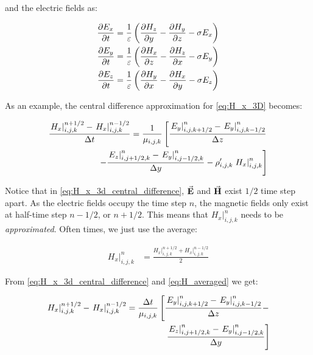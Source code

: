 \documentclass[11pt]{article}
\begin{document}
and the electric fields as:

\begin{subequations}
  \begin{align}
    \pdv{E_x}{t} & =\frac{1}{\varepsilon}\left(\pdv{H_z}{y}-\pdv{H_y}{z}-\sigma E_{x}\right) \label{eq:E_x_3D} \\
    \pdv{E_y}{t} & =\frac{1}{\varepsilon}\left(\pdv{H_x}{z}-\pdv{H_z}{x}-\sigma E_{y}\right) \label{eq:E_y_3D} \\
    \pdv{E_z}{t} & =\frac{1}{\varepsilon}\left(\pdv{H_y}{x}-\pdv{H_x}{y}-\sigma E_{z}\right) \label{eq:E_z_3D}
  \end{align}
  \label{eq:electric}
\end{subequations}

As an example, the central difference approximation for \eqref{eq:H_x_3D} becomes:

\begin{align}
  \frac{\left. H_{x} \right|^{n + 1/2}_{i,j,k} - \left. H_{x} \right|^{n - 1/2}_{i,j,k}}{\Delta t}  = \frac{1}{\mu_{i,j,k}}
  \left[
  \frac{\left. E_y \right|^{n}_{i,j,k+1/2} - \left. E_y \right|^{n}_{i,j,k-1/2}}{\Delta z}  \right. \nonumber \\
  \left. - \frac{\left. E_z \right|^{n}_{i,j+1/2,k} - \left. E_y \right|^{n}_{i,j-1/2,k}}{\Delta y} - \rho'_{i,j,k} \left. H_x \right|^{n}_{i,j,k}
  \right]                                                        \label{eq:H_x_3d_central_difference}
\end{align}

Notice that in \eqref{eq:H_x_3d_central_difference}, $\va{E}$ and $\va{H}$ exist $1/2$ time step apart. As the electric fields occupy the time step $n$, the magnetic fields only exist at half-time step $n - 1/2$, or  $n + 1/2$. This means that $\left. H_x \right|^n_{i,j,k}$ needs to be \textit{approximated}. Often times, we just use the average:

\begin{align}
  \left. H_x \right|^n_{i,j,k} & = \frac{\left. H_x \right|^{n+1/2}_{i,j,k} + \left. H_x \right|^{n-1/2}_{i,j,k}}{2}
  \label{eq:H_averaged}
\end{align}

From \eqref{eq:H_x_3d_central_difference} and \eqref{eq:H_averaged} we get:

\begin{align}
  \left. H_{x} \right|^{n + 1/2}_{i,j,k} - \left. H_{x} \right|^{n - 1/2}_{i,j,k} = \frac{\Delta t}{\mu_{i,j,k}}
  \left[
  \frac{\left. E_y \right|^{n}_{i,j,k+1/2} - \left. E_y \right|^{n}_{i,j,k-1/2}}{\Delta z} - \right. \nonumber \\
  \left. \frac{\left. E_z \right|^{n}_{i,j+1/2,k} - \left. E_y \right|^{n}_{i,j-1/2,k}}{\Delta y}
  \right]
  \label{eq:solving_H_3d}
\end{align}
\end{document}
